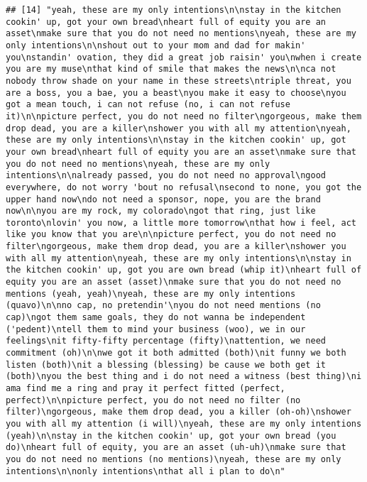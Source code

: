 \documentclass[]{article}
\begin{document}
\begin{verbatim}
## [14] "yeah, these are my only intentions\n\nstay in the kitchen cookin' up, got your own bread\nheart full of equity you are an asset\nmake sure that you do not need no mentions\nyeah, these are my only intentions\n\nshout out to your mom and dad for makin' you\nstandin' ovation, they did a great job raisin' you\nwhen i create you are my muse\nthat kind of smile that makes the news\n\nca not nobody throw shade on your name in these streets\ntriple threat, you are a boss, you a bae, you a beast\nyou make it easy to choose\nyou got a mean touch, i can not refuse (no, i can not refuse it)\n\npicture perfect, you do not need no filter\ngorgeous, make them drop dead, you are a killer\nshower you with all my attention\nyeah, these are my only intentions\n\nstay in the kitchen cookin' up, got your own bread\nheart full of equity you are an asset\nmake sure that you do not need no mentions\nyeah, these are my only intentions\n\nalready passed, you do not need no approval\ngood everywhere, do not worry 'bout no refusal\nsecond to none, you got the upper hand now\ndo not need a sponsor, nope, you are the brand now\n\nyou are my rock, my colorado\ngot that ring, just like toronto\nlovin' you now, a little more tomorrow\nthat how i feel, act like you know that you are\n\npicture perfect, you do not need no filter\ngorgeous, make them drop dead, you are a killer\nshower you with all my attention\nyeah, these are my only intentions\n\nstay in the kitchen cookin' up, got you are own bread (whip it)\nheart full of equity you are an asset (asset)\nmake sure that you do not need no mentions (yeah, yeah)\nyeah, these are my only intentions (quavo)\n\nno cap, no pretendin'\nyou do not need mentions (no cap)\ngot them same goals, they do not wanna be independent ('pedent)\ntell them to mind your business (woo), we in our feelings\nit fifty-fifty percentage (fifty)\nattention, we need commitment (oh)\n\nwe got it both admitted (both)\nit funny we both listen (both)\nit a blessing (blessing) be cause we both get it (both)\nyou the best thing and i do not need a witness (best thing)\ni ama find me a ring and pray it perfect fitted (perfect, perfect)\n\npicture perfect, you do not need no filter (no filter)\ngorgeous, make them drop dead, you a killer (oh-oh)\nshower you with all my attention (i will)\nyeah, these are my only intentions (yeah)\n\nstay in the kitchen cookin' up, got your own bread (you do)\nheart full of equity, you are an asset (uh-uh)\nmake sure that you do not need no mentions (no mentions)\nyeah, these are my only intentions\n\nonly intentions\nthat all i plan to do\n"                                                                                                                                                                                                                                                                                                                                                                                                                                                                                                                                                                                                                                                                                                                                  
\end{verbatim}
\end{document}
